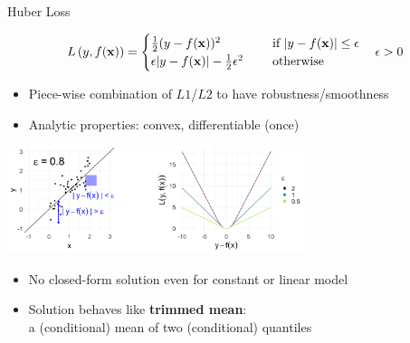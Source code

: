 \documentclass[11pt,compress,t,notes=noshow, xcolor=table]{beamer}
\begin{document}
\begin{vbframe}{Huber Loss}

\vspace*{-0.5cm}

$$
L\left(y, f(\mathbf{x})\right) = \begin{cases}
  \frac{1}{2}(y - f(\mathbf{x}))^2  & \text{ if } |y - f(\mathbf{x})| \le \epsilon \\
  \epsilon |y - f(\mathbf{x})|-\frac{1}{2}\epsilon^2 \quad & \text{ otherwise }
  \end{cases} \quad \epsilon > 0
$$

\begin{itemize}
\item Piece-wise combination of $L1$/$L2$ to have robustness/smoothness
\item Analytic properties: convex, differentiable (once)
\end{itemize}

\begin{center}
\includegraphics[width = 0.65\textwidth]{figure/loss_huber_plot.png}
\end{center}

\begin{itemize}
\item No closed-form solution even for constant or linear model
\item Solution behaves like \textbf{trimmed mean}:\\
a (conditional) mean of two (conditional) quantiles  
\end{itemize}

\end{vbframe}
\end{document}
